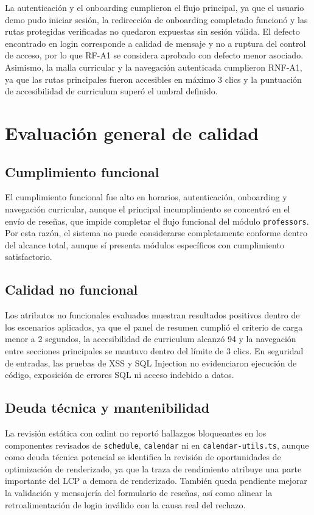 \documentclass[11pt,spanish]{article}
\begin{document}
La autenticación y el onboarding cumplieron el flujo principal, ya que el usuario demo pudo iniciar sesión, la redirección de onboarding completado funcionó y las rutas protegidas verificadas no quedaron expuestas sin sesión válida. El defecto encontrado en login corresponde a calidad de mensaje y no a ruptura del control de acceso, por lo que RF-A1 se considera aprobado con defecto menor asociado. Asimismo, la malla curricular y la navegación autenticada cumplieron RNF-A1, ya que las rutas principales fueron accesibles en máximo 3 clics y la puntuación de accesibilidad de curriculum superó el umbral definido.

\section{Evaluación general de calidad}

\subsection{Cumplimiento funcional}

El cumplimiento funcional fue alto en horarios, autenticación, onboarding y navegación curricular, aunque el principal incumplimiento se concentró en el envío de reseñas, que impide completar el flujo funcional del módulo \texttt{professors}. Por esta razón, el sistema no puede considerarse completamente conforme dentro del alcance total, aunque sí presenta módulos específicos con cumplimiento satisfactorio.

\subsection{Calidad no funcional}

Los atributos no funcionales evaluados muestran resultados positivos dentro de los escenarios aplicados, ya que el panel de resumen cumplió el criterio de carga menor a 2 segundos, la accesibilidad de curriculum alcanzó 94 y la navegación entre secciones principales se mantuvo dentro del límite de 3 clics. En seguridad de entradas, las pruebas de XSS y SQL Injection no evidenciaron ejecución de código, exposición de errores SQL ni acceso indebido a datos.

\subsection{Deuda técnica y mantenibilidad}

La revisión estática con oxlint no reportó hallazgos bloqueantes en los componentes revisados de \texttt{schedule}, \texttt{calendar} ni en \texttt{calendar-utils.ts}, aunque como deuda técnica potencial se identifica la revisión de oportunidades de optimización de renderizado, ya que la traza de rendimiento atribuye una parte importante del LCP a demora de renderizado. También queda pendiente mejorar la validación y mensajería del formulario de reseñas, así como alinear la retroalimentación de login inválido con la causa real del rechazo.
\end{document}
